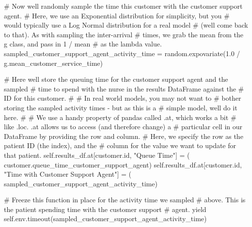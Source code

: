\documentclass[
  letterpaper,
  DIV=11,
  numbers=noendperiod]{scrreprt}
\newenvironment{Shaded}{}{}
\newcommand{\BuiltInTok}[1]{\textcolor[rgb]{0.84,0.23,0.29}{#1}}
\newcommand{\CommentTok}[1]{\textcolor[rgb]{0.42,0.45,0.49}{#1}}
\newcommand{\ControlFlowTok}[1]{\textcolor[rgb]{0.84,0.23,0.29}{#1}}
\newcommand{\FloatTok}[1]{\textcolor[rgb]{0.00,0.36,0.77}{#1}}
\newcommand{\NormalTok}[1]{\textcolor[rgb]{0.14,0.16,0.18}{#1}}
\newcommand{\OperatorTok}[1]{\textcolor[rgb]{0.14,0.16,0.18}{#1}}
\newcommand{\StringTok}[1]{\textcolor[rgb]{0.01,0.18,0.38}{#1}}
\newcommand{\VariableTok}[1]{\textcolor[rgb]{0.89,0.38,0.04}{#1}}
\begin{document}
\begin{tcolorbox}
\begin{Shaded}
\begin{Highlighting}[]
            \CommentTok{\# Now we\textquotesingle{}ll randomly sample the time this customer with the customer support agent.}
            \CommentTok{\# Here, we use an Exponential distribution for simplicity, but you}
            \CommentTok{\# would typically use a Log Normal distribution for a real model}
            \CommentTok{\# (we\textquotesingle{}ll come back to that).  As with sampling the inter{-}arrival}
            \CommentTok{\# times, we grab the mean from the g class, and pass in 1 / mean}
            \CommentTok{\# as the lambda value.}
\NormalTok{            sampled\_customer\_support\_agent\_activity\_time }\OperatorTok{=}\NormalTok{ random.expovariate(}\FloatTok{1.0} \OperatorTok{/}
\NormalTok{                                                        g.mean\_customer\_service\_time)}

            \CommentTok{\# Here we\textquotesingle{}ll store the queuing time for the customer support agent and the sampled}
            \CommentTok{\# time to spend with the nurse in the results DataFrame against the}
            \CommentTok{\# ID for this customer.}
            \CommentTok{\#}
            \CommentTok{\# In real world models, you may not want to}
            \CommentTok{\# bother storing the sampled activity times {-} but as this is a}
            \CommentTok{\# simple model, we\textquotesingle{}ll do it here.}
            \CommentTok{\#}
            \CommentTok{\# We use a handy property of pandas called .at, which works a bit}
            \CommentTok{\# like .loc.  .at allows us to access (and therefore change) a}
            \CommentTok{\# particular cell in our DataFrame by providing the row and column.}
            \CommentTok{\# Here, we specify the row as the patient ID (the index), and the}
            \CommentTok{\# column for the value we want to update for that patient.}
            \VariableTok{self}\NormalTok{.results\_df.at[customer.}\BuiltInTok{id}\NormalTok{, }\StringTok{"Queue Time"}\NormalTok{] }\OperatorTok{=}\NormalTok{ (}
\NormalTok{                customer.queue\_time\_customer\_support\_agent)}
            \VariableTok{self}\NormalTok{.results\_df.at[customer.}\BuiltInTok{id}\NormalTok{, }\StringTok{"Time with Customer Support Agent"}\NormalTok{] }\OperatorTok{=}\NormalTok{ (}
\NormalTok{                sampled\_customer\_support\_agent\_activity\_time)}

            \CommentTok{\# Freeze this function in place for the activity time we sampled}
            \CommentTok{\# above.  This is the patient spending time with the customer support}
            \CommentTok{\# agent.}
            \ControlFlowTok{yield} \VariableTok{self}\NormalTok{.env.timeout(sampled\_customer\_support\_agent\_activity\_time)}


\end{Highlighting}
\end{Shaded}
\end{tcolorbox}
\end{document}
